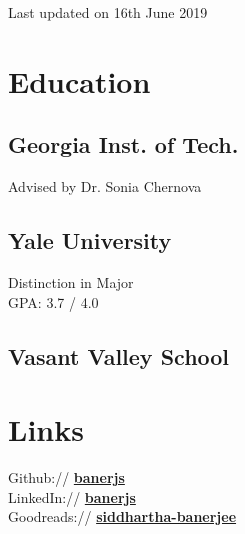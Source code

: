 \documentclass[]{deedy-resume}
\begin{document}
%
%
{\par\hfill{\scriptsize\color{gray}Last updated on 16th June 2019}}

%
%

%
%

\begin{minipage}[t]{0.33\textwidth}


\section{Education}

\subsection{Georgia Inst. of Tech.}
Advised by Dr. Sonia Chernova
\sectionsep

\subsection{Yale University}
Distinction in Major \\
GPA: 3.7 / 4.0
\sectionsep

\subsection{Vasant Valley School}


\section{Links}
Github:// \href{https://github.com/banerjs}{\bf banerjs} \\
LinkedIn://  \href{https://www.linkedin.com/in/banerjs}{\bf banerjs} \\
Goodreads:// \href{https://www.goodreads.com/user/show/41408373-siddhartha-banerjee}{\bf siddhartha-banerjee}


\end{minipage}
\end{document}
